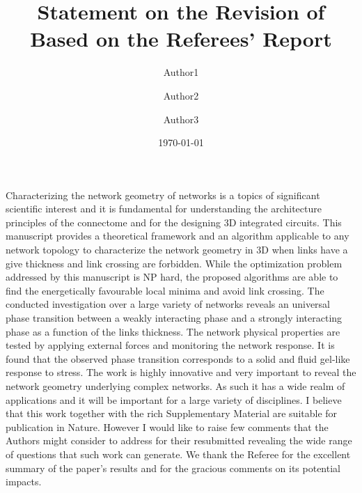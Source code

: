 \documentclass[11pt]{article}
\title{Statement on the Revision of \meta{Paper ID} \\
  Based on the Referees' Report}
\author{Author1 \and Author2 \and Author3}
\date{\today}
\newcommand{\outNim}[1]{}
\newcommand\meta[1]{$\langle\hbox{#1}\rangle$}
\newcommand\PaperTitle[1]{``\textit{#1}''}
\begin{document}
\outNim{
\subsection*{TODO}

 \linespread{1}

\begin{enumerate}
    \item Code online
    \item Why using $d\log\be{R}/d\log r_N$? 
    Advantage over $dV/dr$?
    \item Wouldn't it be a first order transition if slope of $V $ shows discontinuity?
\end{enumerate}
}%
 \linespread{1.5}

\begin{response}{
Characterizing the network geometry of networks is a topics of significant scientific interest and it is fundamental for understanding the architecture principles of the connectome and for the designing 3D integrated circuits. This manuscript provides a theoretical framework and an algorithm applicable to any network topology to characterize the network geometry in 3D when links have a give thickness and link crossing are forbidden.
While the optimization problem addressed by this manuscript is NP hard, the proposed algorithms are able to find the energetically favourable local minima and avoid link crossing. The conducted investigation over a large variety of networks reveals an universal phase transition between a weakly interacting phase and a strongly interacting phase as a function of the links thickness. The network physical properties are tested by applying external forces and monitoring the network response. It is found that the observed phase transition corresponds to a solid and fluid gel-like response to stress.
The work is highly innovative and very important to reveal the network geometry underlying complex networks. As such it has a wide realm of applications and it will be important for a large variety of disciplines. I believe that this work together with the rich Supplementary Material are suitable for publication in Nature.
However I would like to raise few comments that the Authors might consider to address for their resubmitted revealing the wide range of questions that such work can generate.
}
We thank the Referee for the excellent summary of the paper's results and for the gracious comments on its potential impacts. 

\end{response}
\end{document}
